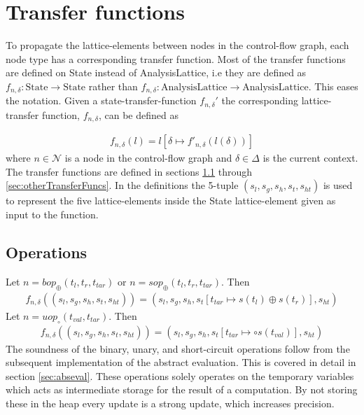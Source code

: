 \section{Transfer functions}
\label{sec:transferf}
\newcommand{\letin}[1]{\texttt{let } #1 \texttt{ in }}
\newcommand{\ifelse}[3]{\texttt{if }#1\texttt{ then } #2 \texttt{ else } #3}
\newcommand{\match}[1]{\texttt{match }#1}
\newcommand{\with}[1]{\texttt{with }#1\text{: }}
\newcommand{\coerce}[2]{c_{\text{#1}, \text{#2}}}
\newcommand{\default}{\texttt{default: }}
To propagate the lattice-elements between nodes in the control-flow graph, each node type has a corresponding transfer function. Most of the transfer functions are defined on State instead of {AnalysisLattice}, i.e they are defined as $f_{n,\delta} : \text{State} \rightarrow \text{State}$ rather than $f_{n,\delta} : \text{AnalysisLattice} \rightarrow \text{AnalysisLattice}$. This eases the notation. Given a state-transfer-function $f_{n,\delta}'$ the corresponding lattice-transfer function, $f_{n,\delta}$, can be defined as

\begin{align}
f_{n,\delta}(l) = l[\delta\mapsto f'_{n, \delta}(l(\delta))]
\end{align}
where $n\in\mathcal{N}$ is a node in the control-flow graph and $\delta\in \Delta$ is the current context. The transfer functions are defined in sections \ref{sec:operations} through \ref{sec:otherTransferFuncs}. In the definitions the 5-tuple $(s_l, s_g, s_h, s_t, s_{ht})$ is used to represent the five lattice-elements inside the State lattice-element given as input to the function.

\subsection{Operations}
\label{sec:operations}
Let $n = \mathit{bop}_\oplus(t_l,t_r,t_{tar})$ or $n =  \mathit{sop}_\oplus(t_l,t_r,t_{tar})$. Then 
\begin{align}
f_{n,\delta}((s_l, s_g, s_h, s_t, s_{ht})) = (s_l, s_g, s_h, s_t[t_{tar}\mapsto s(t_l)\oplus s(t_r)], s_{ht})
\end{align}
Let $n = uop_\circ(t_{val},t_{tar})$. Then
\begin{align}
f_{n,\delta}((s_l, s_g, s_h, s_t, s_{ht})) = (s_l, s_g, s_h, s_t[t_{tar}\mapsto \circ s(t_{val})], s_{ht})
\end{align}
The soundness of the binary, unary, and short-circuit operations follow from the subsequent implementation of the abstract evaluation. This is covered in detail in section \ref{sec:abseval}. These operations solely operates on the temporary variables which acts as intermediate storage for the result of a computation. By not storing these in the heap every update is a strong update, which increases precision.


